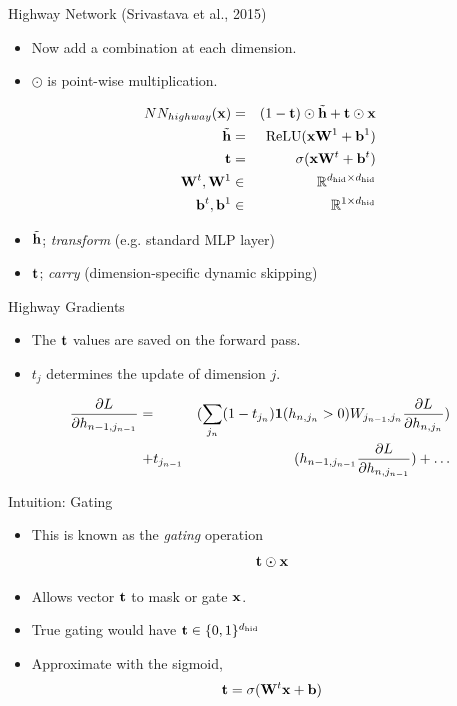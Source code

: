 \documentclass{beamer}
\begin{document}
\begin{frame}{Highway Network (Srivastava et al., 2015)}
  \begin{itemize}
  \item Now add a combination at each dimension.
  \item $\odot$ is point-wise multiplication. 
  \end{itemize}
  \begin{eqnarray*}
    NN_{highway}(\boldx) &=& (1-\boldt) \odot \tilde{\boldh} + \boldt \odot \boldx \\
    \tilde{\boldh} &=& \relu(\boldx \boldW^1 + \boldb^1) \\
    \boldt &=& \sigma(\boldx \boldW^t + \boldb^t) \\
    \boldW^t, \boldW^1 &\in& \reals^{\dhid \times \dhid} \\
    \boldb^t, \boldb^1 &\in& \reals^{1 \times \dhid} 
  \end{eqnarray*}
  \begin{itemize}
  \item $\tilde{\mathbf{h}}$; \textit{transform} (e.g. standard MLP layer)
  \item $\mathbf{t}$; \textit{carry} (dimension-specific dynamic skipping)
  \end{itemize}
\end{frame}

\begin{frame}{Highway Gradients}
  \begin{itemize}
  \item The $\mathbf{t}$ values are saved on the forward pass.
    \air 
  \item $t_j$ determines the update of dimension $j$. 
  \end{itemize}
  \begin{eqnarray*}
     \frac{\partial L}{\partial h_{n-1,j_{n-1}} }  =  && (\sum_{j_n} (1-t_{j_n})  \mathbf{1}(h_{n, j_n} > 0) W_{j_{n-1},j_n} \frac{\partial L}{\partial h_{n, j_n}}) \\
    + &t_{j_{n-1}}& ( h_{n-1, j_{n-1}} \frac{\partial L}{\partial h_{n, j_{n-1}}}) + \ldots \\ 
  \end{eqnarray*}
\end{frame}


\begin{frame}{Intuition: Gating}
  \begin{itemize}
  \item This is known as the \textit{gating} operation
    \[ \mathbf{t} \odot \mathbf{x} \]
    \air 

  \item Allows vector $\mathbf{t}$ to mask or gate $\mathbf{x}$.
    \air

  \item True gating would have $\mathbf{t} \in \{0,1\}^{{d_{\mathrm{hid}}}}$

    \air 
  \item Approximate with the sigmoid,
    \[\mathbf{t} = \sigma( \mathbf{W}^t \mathbf{x} + \mathbf{b}) \] 
  \end{itemize}
\end{frame}
\end{document}
